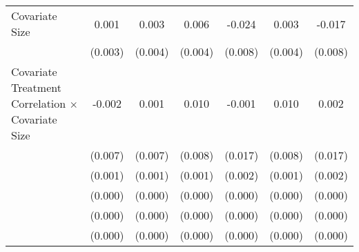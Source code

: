 \begin{table}[htbp]
\begin{tabular}{l*{6}{c}}
Covariate Size      &       0.001         &       0.003         &       0.006         &      -0.024\sym{**} &       0.003         &      -0.017\sym{*}  \\
                    &     (0.003)         &     (0.004)         &     (0.004)         &     (0.008)         &     (0.004)         &     (0.008)         \\
Covariate Treatment Correlation $\times$ Covariate Size&      -0.002         &       0.001         &       0.010         &      -0.001         &       0.010         &       0.002         \\
                    &     (0.007)         &     (0.007)         &     (0.008)         &     (0.017)         &     (0.008)         &     (0.017)         \\
                    &     (0.001)         &     (0.001)         &     (0.001)         &     (0.002)         &     (0.001)         &     (0.002)         \\
                    &     (0.000)         &     (0.000)         &     (0.000)         &     (0.000)         &     (0.000)         &     (0.000)         \\
                    &     (0.000)         &     (0.000)         &     (0.000)         &     (0.000)         &     (0.000)         &     (0.000)         \\
                    &     (0.000)         &     (0.000)         &     (0.000)         &     (0.000)         &     (0.000)         &     (0.000)         \\

\end{tabular}
\end{table}
